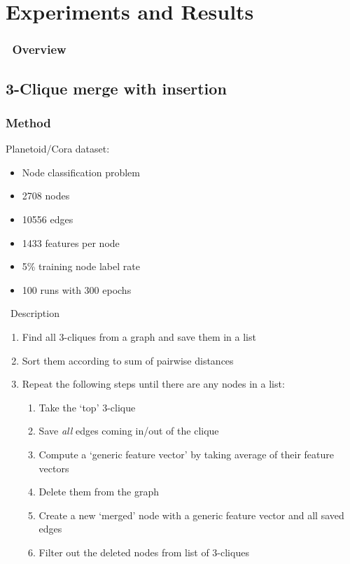 \section{Experiments and Results}

\begin{frame}
   \frametitle{\secname\ Overview}
   \tableofcontents[currentsection]
\end{frame}

\subsection{3-Clique merge with insertion}
\begin{frame}
	\frametitle{Method}
	Planetoid/Cora dataset:

	\begin{itemize}
		\item Node classification problem
		\item 2708 nodes
		\item 10556 edges
		\item 1433 features per node
		\item 5\% training node label rate
		\item 100 runs with 300 epochs
	\end{itemize}
\end{frame}

\begin{frame}{\subsecname\ Description}
	\begin{enumerate}
		\item Find all 3-cliques from a graph and save them in a list
		\item Sort them according to sum of pairwise distances
		\item Repeat the following steps until there are any nodes in a list:
			\begin{enumerate}
				\item Take the `top' 3-clique
				\item Save \emph{all} edges coming in/out of the clique
				\item Compute a `generic feature vector' by taking average of their feature vectors
				\item Delete them from the graph
				\item Create a new `merged' node with a generic feature vector and all saved edges
				\item Filter out the deleted nodes from list of 3-cliques
			\end{enumerate}
	\end{enumerate}
\end{frame}

